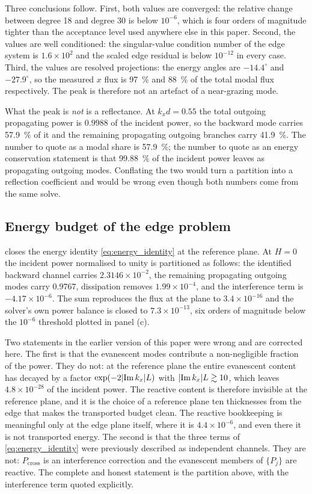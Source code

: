 Three conclusions follow.  First, both values are converged: the relative change
between degree 18 and degree 30 is below $10^{-6}$, which is four orders of
magnitude tighter than the acceptance level used anywhere else in this paper.
Second, the values are well conditioned: the singular-value condition number of
the edge system is $1.6\times10^{2}$ and the scaled edge residual is below
$10^{-12}$ in every case.  Third, the values are resolved projections: the
energy angles are $-14.4^{\circ}$ and $-27.9^{\circ}$, so the measured $x$ flux
is \SI{97}{\percent} and \SI{88}{\percent} of the total modal flux respectively.
The peak is therefore not an artefact of a near-grazing mode.

What the peak is \emph{not} is a reflectance.  At $k_xd=0.55$ the total
outgoing propagating power is $0.9988$ of the incident power, so the backward
mode carries \SI{57.9}{\percent} of it and the remaining propagating outgoing
branches carry \SI{41.9}{\percent}.  The number to quote as a modal share is
\SI{57.9}{\percent}; the number to quote as an energy conservation statement is
that \SI{99.88}{\percent} of the incident power leaves as propagating outgoing
modes.  Conflating the two would turn a partition into a reflection coefficient
and would be wrong even though both numbers come from the same solve.

\subsection{Energy budget of the edge problem}
\label{sec:results_channel}

 closes the energy identity \eqref{eq:energy_identity} at the
reference plane.  At $H=0$ the incident power normalised to unity is partitioned
as follows: the identified backward channel carries $2.3146\times10^{-2}$, the
remaining propagating outgoing modes carry $0.9767$, dissipation removes
$1.99\times10^{-4}$, and the interference term is $-4.17\times10^{-6}$.  The
sum reproduces the flux at the plane to $3.4\times10^{-16}$ and the solver's own
power balance is closed to $7.3\times10^{-13}$, six orders of magnitude below
the $10^{-6}$ threshold plotted in panel (c).

Two statements in the earlier version of this paper were wrong and are corrected
here.  The first is that the evanescent modes contribute a non-negligible
fraction of the power.  They do not: at the reference plane the entire
evanescent content has decayed by a factor $\exp(-2|{\operatorname{Im} k_x}|L)$ with
$|{\operatorname{Im} k_x}|L\gtrsim10$, which leaves $4.8\times10^{-28}$ of the incident
power.  The reactive content is therefore invisible at the reference plane, and
it is the choice of a reference plane ten thicknesses from the edge that makes
the transported budget clean.  The reactive bookkeeping is meaningful only
at the edge plane itself, where it is $4.4\times10^{-6}$, and even there it is
not transported energy.  The second is that the three terms of
\eqref{eq:energy_identity} were previously described as independent channels.
They are not: $P_{\text{cross}}$ is an interference correction and the
evanescent members of $\{P_j\}$ are reactive.  The complete and honest
statement is the partition above, with the interference term quoted explicitly.


